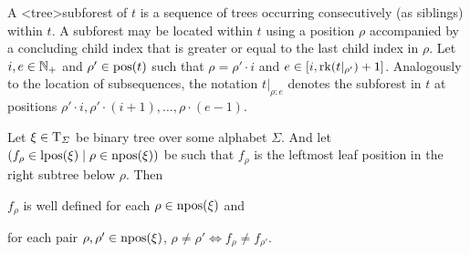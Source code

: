 \documentclass[../document.tex]{subfiles}
\begin{document}
    A <tree>{subforest} of \(t\) is a sequence of trees occurring consecutively (as siblings) within \(t\).
    A subforest may be located within \(t\) using a position \(\rho\) accompanied by a concluding child index that is greater or equal to the last child index in \(\rho\).
    Let \(i, e \in \mathbb{N}_+\) and \(\rho' \in \operatorname{pos}(t)\) such that \(\rho = \rho' \cdot i\) and \(e \in [i,\operatorname{rk}(t|_{\rho'})+1]\).
    Analogously to the location of subsequences, the notation \(t|_{\rho:e}\) denotes the subforest in \(t\) at positions \(\rho' \cdot i, \rho' \cdot (i+1), \ldots, \rho \cdot (e-1)\).

    \begin{lemma}\label{lem:firstviasecond}
        Let \(\xi \in \operatorname{T}_{\varSigma}\) be binary tree over some alphabet \(\varSigma\).
        And let \((f_\rho \in \operatorname{lpos}(\xi) \mid \rho \in \operatorname{npos}(\xi))\) be such that \(f_\rho\) is the leftmost leaf position in the right subtree below \(\rho\).
        Then
        \begin{inparaenum}
            \item \(f_\rho\) is well defined for each \(\rho \in \operatorname{npos}(\xi)\) and
            \item for each pair \(\rho, \rho' \in \operatorname{npos}(\xi)\), \(\rho \neq \rho' \iff f_\rho \neq f_{\rho'}\).
        \end{inparaenum}
    \end{lemma}

\end{document}
